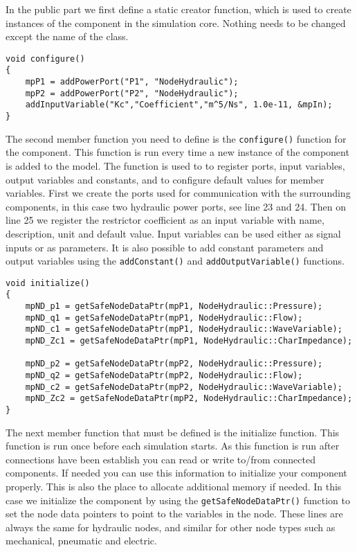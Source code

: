 \documentclass[a4paper,pdftex]{article}
\begin{document}
\noindent In the public part we first define a static creator function, which is used to create instances of the component in the simulation core. 
Nothing needs to be changed except the name of the class.

\begin{minipage}{\linewidth}
\begin{lstlisting}[firstnumber=21, basicstyle=\footnotesize\ttfamily]
void configure()
{
    mpP1 = addPowerPort("P1", "NodeHydraulic");
    mpP2 = addPowerPort("P2", "NodeHydraulic");
    addInputVariable("Kc","Coefficient","m^5/Ns", 1.0e-11, &mpIn);
}
\end{lstlisting}
\end{minipage}
\noindent The second member function you need to define is the \texttt{configure()} function for the component. 
This function is run every time a new instance of the component is added to the model. 
The function is used to to register ports, input variables, output variables and constants, and to configure default values for member variables. 
First we create the ports used for communication with the surrounding components, in this case two hydraulic power ports, see line 23 and 24. 
Then on line 25 we register the restrictor coefficient as an input variable with name, description, unit and default value. 
Input variables can be used either as signal inputs or as parameters.
It is also possible to add constant parameters and output variables using the \texttt{addConstant()} and \texttt{addOutputVariable()} functions.

\begin{minipage}{\linewidth}
\begin{lstlisting}[firstnumber=27, basicstyle=\footnotesize\ttfamily]
void initialize()
{
    mpND_p1 = getSafeNodeDataPtr(mpP1, NodeHydraulic::Pressure);
    mpND_q1 = getSafeNodeDataPtr(mpP1, NodeHydraulic::Flow);
    mpND_c1 = getSafeNodeDataPtr(mpP1, NodeHydraulic::WaveVariable);
    mpND_Zc1 = getSafeNodeDataPtr(mpP1, NodeHydraulic::CharImpedance);

    mpND_p2 = getSafeNodeDataPtr(mpP2, NodeHydraulic::Pressure);
    mpND_q2 = getSafeNodeDataPtr(mpP2, NodeHydraulic::Flow);
    mpND_c2 = getSafeNodeDataPtr(mpP2, NodeHydraulic::WaveVariable);
    mpND_Zc2 = getSafeNodeDataPtr(mpP2, NodeHydraulic::CharImpedance);
}
\end{lstlisting}
\end{minipage}

\noindent The next member function that must be defined is the initialize function. 
This function is run once before each simulation starts. 
As this function is run after connections have been establish you can read or write to/from connected components. 
If needed you can use this information to initialize your component properly. 
This is also the place to allocate additional memory if needed. 
In this case we initialize the component by using the \texttt{getSafeNodeDataPtr()} function to set the node data pointers to point to the variables in the node. 
These lines are always the same for hydraulic nodes, and similar for other node types such as mechanical, pneumatic and electric.
\end{document}
